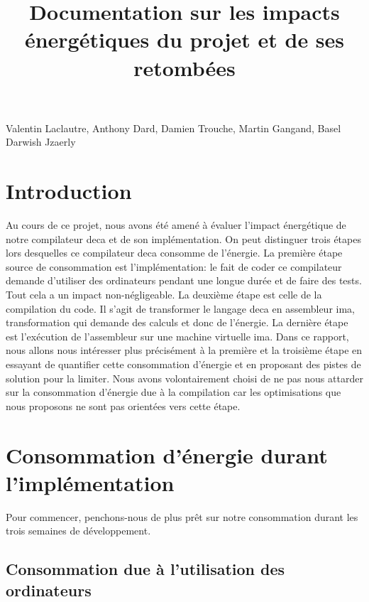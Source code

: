 \documentclass[12pt, a4paper, one side]{article}
\title{Documentation sur les impacts énergétiques du projet et de ses retombées}
\author{}
\date{}
\begin{document}
\maketitle

\begin{center}
    Valentin Laclautre, Anthony Dard, Damien Trouche, Martin Gangand, Basel Darwish Jzaerly
\end{center}

\tableofcontents

\newpage

\section{Introduction}

Au cours de ce projet, nous avons été amené à évaluer l'impact énergétique de notre compilateur deca et de son implémentation. On peut distinguer trois étapes lors desquelles ce compilateur deca consomme de l'énergie. La première étape source de consommation est l'implémentation: le fait de coder ce compilateur demande d'utiliser des ordinateurs pendant une longue durée et de faire des tests. Tout cela a un impact non-négligeable. La deuxième étape est celle de la compilation du code. Il s'agit de transformer le langage deca en assembleur ima, transformation qui demande des calculs et donc de l'énergie. La dernière étape est l'exécution de l'assembleur sur une machine virtuelle ima. Dans ce rapport, nous allons nous intéresser plus précisément à la première et la troisième étape en essayant de quantifier cette consommation d'énergie et en proposant des pistes de solution pour la limiter. Nous avons volontairement choisi de ne pas nous attarder sur la consommation d'énergie due à la compilation car les optimisations que nous proposons ne sont pas orientées vers cette étape.



\section{Consommation d'énergie durant l'implémentation}

Pour commencer, penchons-nous de plus prêt sur notre consommation durant les trois semaines de développement.

\subsection{Consommation due à l'utilisation des ordinateurs}
\end{document}
